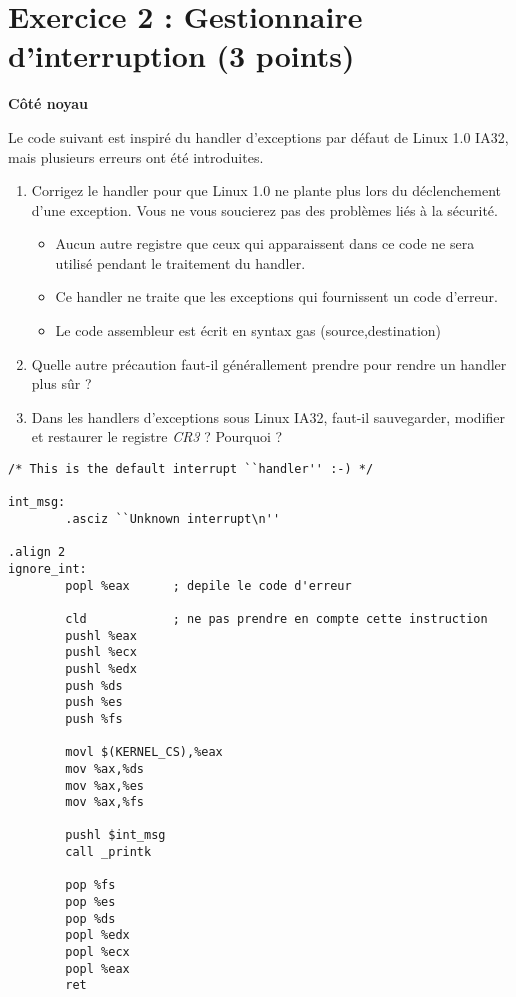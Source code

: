 \section*{Exercice 2 : Gestionnaire d'interruption (3 points)}

{\bf C\^ot\'e noyau}

Le code suivant est inspir\'e du handler d'exceptions par d\'efaut de Linux 1.0 IA32, mais plusieurs erreurs ont \'et\'e introduites.

\begin{enumerate}
\item Corrigez le handler pour que Linux 1.0 ne plante plus lors du d\'eclenchement d'une exception. Vous ne vous soucierez pas des probl\`emes li\'es \`a la s\'ecurit\'e.
\begin{itemize}
\item Aucun autre registre que ceux qui apparaissent dans ce code ne sera utilis\'e pendant le traitement du handler.
\item Ce handler ne traite que les exceptions qui fournissent un code d'erreur.
\item Le code assembleur est \'ecrit en syntax gas (source,destination)
\end{itemize}

\item Quelle autre pr\'ecaution faut-il g\'en\'erallement prendre pour rendre un handler plus s\^ur ?

\item Dans les handlers d'exceptions sous Linux IA32, faut-il sauvegarder, modifier et restaurer le registre {\em CR3} ? Pourquoi ?
\end{enumerate}



\begin{verbatim}
/* This is the default interrupt ``handler'' :-) */

int_msg:
        .asciz ``Unknown interrupt\n''

.align 2
ignore_int:
        popl %eax      ; depile le code d'erreur

        cld            ; ne pas prendre en compte cette instruction
        pushl %eax
        pushl %ecx
        pushl %edx
        push %ds
        push %es
        push %fs

        movl $(KERNEL_CS),%eax
        mov %ax,%ds
        mov %ax,%es
        mov %ax,%fs

        pushl $int_msg
        call _printk

        pop %fs
        pop %es
        pop %ds
        popl %edx
        popl %ecx
        popl %eax
        ret
\end{verbatim}




